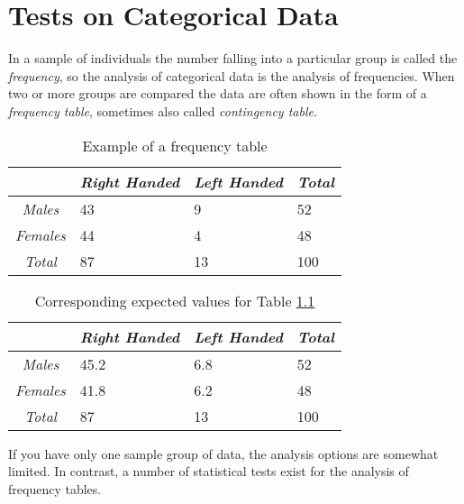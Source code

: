 \chapter{Tests on Categorical Data }

In a sample of individuals the number falling into a particular group is called the \emph{frequency}, so the analysis of categorical data is the analysis of frequencies. When two or more groups are compared the data are often shown in the form of a \emph{frequency table}, sometimes also called \emph{contingency table}.

\begin{table}
  \centering
  \begin{tabular}{|c|l l l|}
  \hline
  & \emph{Right Handed} & \emph{Left Handed} & \emph{Total} \\
  \hline
  \emph{Males} & 43 & 9 & 52 \\
  \emph{Females} & 44 & 4 & 48 \\
  \emph{Total} & 87 & 13 & 100 \\
  \hline
  \end{tabular}

  \caption{Example of a frequency table}\label{table:frequency}
\end{table}

\begin{table}
  \centering
  \begin{tabular}{|c|l l l|}
  \hline
  & \emph{Right Handed} & \emph{Left Handed} & \emph{Total} \\
  \hline
  \emph{Males} & 45.2 & 6.8 & 52 \\
  \emph{Females} & 41.8 & 6.2 & 48 \\
  \emph{Total} & 87 & 13 & 100 \\
  \hline
  \end{tabular}

  \caption{Corresponding expected values for Table \ref{table:frequency}\label{table:expectedValues}}
\end{table}

If you have only one sample group of data, the analysis options are somewhat limited. In contrast, a number of statistical tests exist for the analysis of frequency tables.

